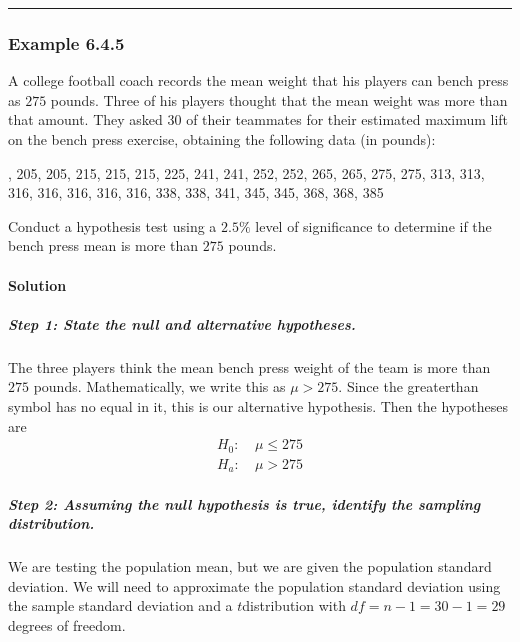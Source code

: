 \documentclass[letterpaper,10pt,english]{jupyterBook}
\begin{document}
\bigskip\hrule\bigskip



\subsubsection{Example 6.4.5}
\label{\detokenize{Ch6 An Introduction to Hypothesis Testing/6.4 Hypothesis Tests of One Population:example-6-4-5}}
\sphinxAtStartPar
A college football coach records the mean weight that his players can bench press as \(275\) pounds. Three of his players thought that the mean weight was more than that amount. They asked \(30\) of their teammates for their estimated maximum lift on the bench press exercise, obtaining the following data (in pounds):

, 205, 205, 215, 215, 215, 225, 241, 241, 252, 252, 265, 265, 275, 275, 313, 313, 316, 316, 316, 316, 316, 338, 338, 341, 345, 345, 368, 368, 385

\sphinxAtStartPar
Conduct a hypothesis test using a \(2.5\%\) level of significance to determine if the bench press mean is more than \(275\) pounds.


\paragraph{Solution}
\label{\detokenize{Ch6 An Introduction to Hypothesis Testing/6.4 Hypothesis Tests of One Population:id4}}

\subparagraph{Step 1: State the null and alternative hypotheses.}
\label{\detokenize{Ch6 An Introduction to Hypothesis Testing/6.4 Hypothesis Tests of One Population:id5}}
\sphinxAtStartPar
The three players think the mean bench press weight of the team is more than \(275\) pounds. Mathematically, we write this as \(\mu > 275\). Since the greater\sphinxhyphen{}than symbol has no equal in it, this is our alternative hypothesis. Then the hypotheses are
\begin{align*}
H_0:&\ \mu \leq 275 \\
H_a:&\ \mu > 275
\end{align*}

\subparagraph{Step 2: Assuming the null hypothesis is true, identify the sampling distribution.}
\label{\detokenize{Ch6 An Introduction to Hypothesis Testing/6.4 Hypothesis Tests of One Population:id6}}
\sphinxAtStartPar
We are testing the population mean, but we are  given the population standard deviation. We will need to approximate the population standard deviation using the sample standard deviation and a \(t\)\sphinxhyphen{}distribution with \(df = n-1 = 30-1 = 29 \) degrees of freedom.
\end{document}
